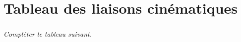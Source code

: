 \documentclass[10pt]{article}
\begin{document}






%
%

\section*{Tableau des liaisons cinématiques}
\subparagraph*{}\textit{Compléter le tableau suivant.}
\end{document}

